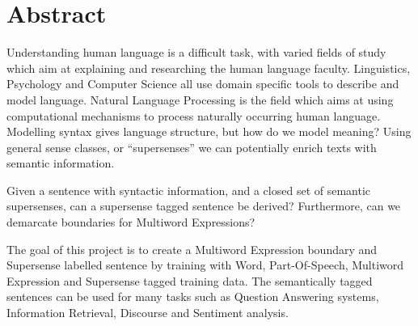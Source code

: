 \chapter*{\Large \center Abstract}\label{abstract}

Understanding human language is a difficult task, with varied fields of study which aim at explaining and researching the human language faculty. Linguistics, Psychology and Computer Science all use domain specific tools to describe and model language. Natural Language Processing is the field which aims at using computational mechanisms to process naturally occurring human language. Modelling syntax gives language structure, but how do we model meaning? Using general sense classes, or ``supersenses'' we can potentially enrich texts with semantic information.

Given a sentence with syntactic information, and a closed set of semantic supersenses, can a supersense tagged sentence be derived? Furthermore, can we demarcate boundaries for Multiword Expressions? 

The goal of this project is to create a Multiword Expression boundary and Supersense labelled sentence by training with Word, Part-Of-Speech, Multiword Expression and Supersense tagged training data. The semantically tagged sentences can be used for many tasks such as Question Answering systems, Information Retrieval, Discourse and Sentiment analysis.
